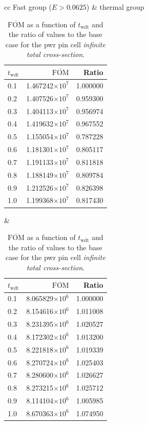 \begin{table}[hbtp]
  \centering
  \caption[$\overline{\mathrm{FOM}}$ and ratio for
  the \acrshort{pwr} pin cell \textit{infinite total cross-section}.]{$\overline{\mathrm{FOM}}$ as a function of
    $t_{\mathrm{wdt}}$ and the ratio of values to the base case for
    the \gls{pwr} pin cell \textit{infinite total cross-section}.}
  \begin{tabular}{cc} Fast group ($E > 0.0625$) & thermal group \\
\begin{tabular}{lrr}
\toprule
$t_{\mathrm{wdt}}$ &                   $\overline{\mathrm{FOM}}$ & Ratio\\
\midrule
 0.1 & 1.467242$\times 10^{7}$ & 1.000000 \\
 0.2 & 1.407526$\times 10^{7}$ & 0.959300 \\
 0.3 & 1.404113$\times 10^{7}$ & 0.956974 \\
 0.4 & 1.419632$\times 10^{7}$ & 0.967552 \\
 0.5 & 1.155054$\times 10^{7}$ & 0.787228 \\
 0.6 & 1.181301$\times 10^{7}$ & 0.805117 \\
 0.7 & 1.191133$\times 10^{7}$ & 0.811818 \\
 0.8 & 1.188149$\times 10^{7}$ & 0.809784 \\
 0.9 & 1.212526$\times 10^{7}$ & 0.826398 \\
 1.0 & 1.199368$\times 10^{7}$ & 0.817430 \\
\bottomrule
\end{tabular} &
\begin{tabular}{lrr}
\toprule
$t_{\mathrm{wdt}}$ &                   $\overline{\mathrm{FOM}}$ &
                                                                   Ratio\\
\midrule
 0.1 & 8.065829$\times 10^{6}$ & 1.000000 \\
 0.2 & 8.154616$\times 10^{6}$ & 1.011008 \\
 0.3 & 8.231395$\times 10^{6}$ & 1.020527 \\
 0.4 & 8.172302$\times 10^{6}$ & 1.013200 \\
 0.5 & 8.221818$\times 10^{6}$ & 1.019339 \\
 0.6 & 8.270724$\times 10^{6}$ & 1.025403 \\
 0.7 & 8.280600$\times 10^{6}$ & 1.026627 \\
 0.8 & 8.273215$\times 10^{6}$ & 1.025712 \\
 0.9 & 8.114104$\times 10^{6}$ & 1.005985 \\
 1.0 & 8.670363$\times 10^{6}$ & 1.074950 \\
\bottomrule
\end{tabular}
  \end{tabular}
  \label{tab:pwr_inf_tot}
\end{table}
